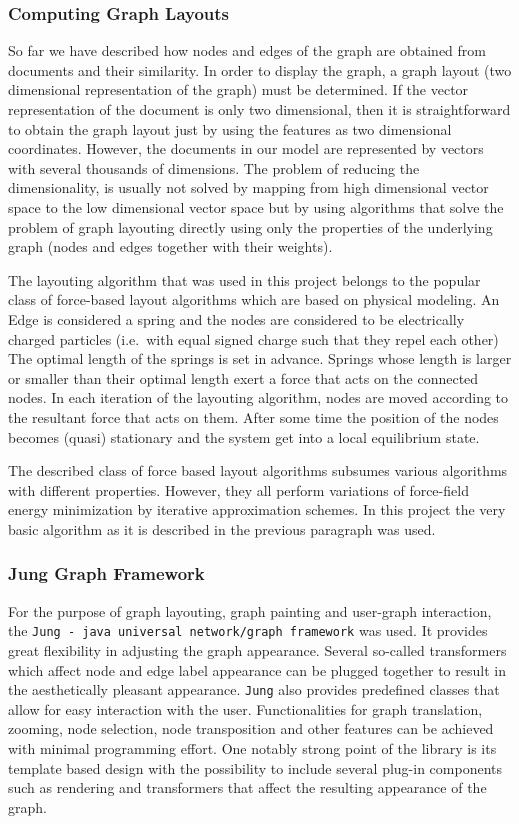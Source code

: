 \subsubsection{Computing Graph Layouts}
So far we have described how nodes and edges of the graph are obtained from documents and their
similarity. In order to display the graph, a graph layout (two dimensional representation of the
graph) must be determined. If the vector representation of the document is only two dimensional,
then it is straightforward to obtain the graph layout just by using the features as two dimensional
coordinates. However, the documents in our model are represented by vectors with several thousands
of dimensions. The problem of reducing the dimensionality, is usually not solved by mapping
from high dimensional vector space to the low dimensional vector space but by using algorithms that
solve the problem of graph layouting directly using only the properties of the underlying graph
(nodes and edges together with their weights).

The layouting algorithm that was used in this project belongs to the popular class of force-based
layout algorithms which are based on physical modeling. An Edge is considered a spring and
the nodes are considered to be electrically charged particles (i.e.\ with equal signed charge such
that they repel each other) The optimal length of the springs is set in advance. Springs whose
length is larger or smaller than their optimal length exert a force that acts on the connected
nodes. In each iteration of the layouting algorithm, nodes are moved according to the resultant
force
that acts on them. After some time the position of the nodes becomes (quasi) stationary and the
system get into a local equilibrium state.

The described class of force based layout algorithms subsumes various algorithms with different
properties. However, they all perform variations of force-field energy minimization by iterative
approximation schemes. In this project the very basic algorithm as it is described in the previous
paragraph was used.

\subsubsection{Jung Graph Framework}
For the purpose of graph layouting, graph painting and user-graph interaction, the
\texttt{Jung - java universal network/graph framework} was used. It provides great flexibility in
adjusting the graph appearance. Several so-called transformers which affect node and edge label
appearance can be plugged together to result in the aesthetically pleasant appearance. \texttt{Jung}
also provides predefined classes that allow for easy interaction with the user. Functionalities for
graph translation, zooming, node selection, node transposition and other features can be achieved
with minimal programming effort. One notably strong point of the library is its template based
design with the possibility to include several plug-in components such as rendering and transformers
that affect the resulting appearance of the graph.

